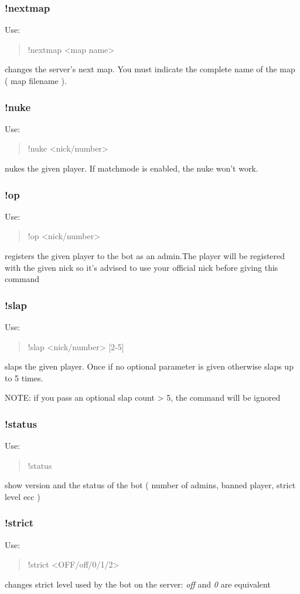 \documentclass[a4paper]{article}
\begin{document}
\subsubsection{!nextmap}
Use:
\begin{quote}
!nextmap \textless{}map name\textgreater{}
\end{quote}
changes the server's next map. You must indicate the complete name of the map ( map filename ).

\subsubsection{!nuke}
Use:
\begin{quote}
!nuke \textless{}nick/number\textgreater{}
\end{quote}
nukes the given player. If matchmode is enabled, the nuke won't work.

\subsubsection{!op}
Use:
\begin{quote}
!op \textless{}nick/number\textgreater{}
\end{quote}
registers the given player to the bot as an admin.The player will be registered with the given nick so it's advised to use your official
nick before giving this command

\subsubsection{!slap}
Use:
\begin{quote}
!slap \textless{}nick/number\textgreater{} [2-5]
\end{quote}
slaps the given player. Once if no optional parameter is given otherwise slaps up to 5 times.

NOTE: if you pass an optional slap count > 5, the command will be ignored

\subsubsection{!status}
Use:
\begin{quote}
!status
\end{quote}
show version and the status of the bot ( number of admins, banned player, strict level ecc )

\subsubsection{!strict}
Use:
\begin{quote}
!strict \textless{}OFF/off/0/1/2\textgreater{}
\end{quote}
changes strict level used by the bot on the server: \textit{off} and \textit{0} are equivalent
\end{document}
